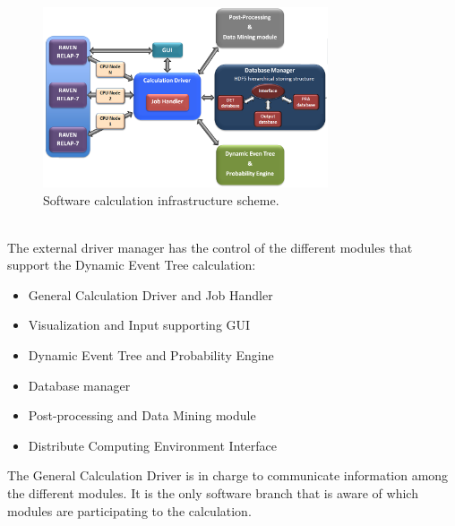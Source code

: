 \documentclass{mc2013}
\begin{document}
\begin{figure}[h] 
  \centering
     \includegraphics[width=0.75\textwidth]{figures/softwareCalcStructure.png}
  \caption{Software calculation infrastructure scheme.}
   \label{fig:softwareInfrastructure}
\end{figure} 
\\The external driver manager has the control of the different modules that support the Dynamic Event Tree calculation:
\vspace{-5mm}
\begin{itemize}
\itemsep0em
\item General Calculation Driver and Job Handler
\item Visualization and Input supporting GUI
\item Dynamic Event Tree and Probability Engine
\item Database manager
\item Post-processing and Data Mining module
\item Distribute Computing Environment Interface
\end{itemize}
\vspace{-5mm}
The General Calculation Driver is in charge to communicate information among the different modules. It is the only software branch that is aware of which modules are participating to the calculation.   
\end{document}
